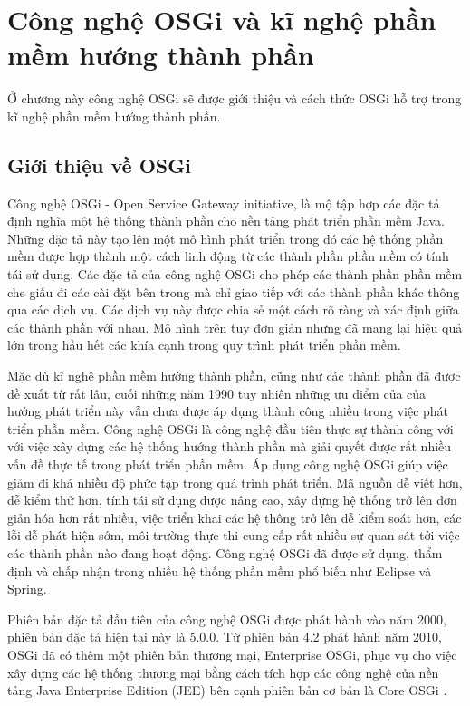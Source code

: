 \chapter{Công nghệ OSGi và kĩ nghệ phần mềm hướng thành phần}
Ở chương này công nghệ OSGi sẽ được giới thiệu và cách thức OSGi hỗ trợ trong kĩ nghệ phần mềm hướng thành phần.  
\section{Giới thiệu về OSGi}
Công nghệ OSGi - Open Service Gateway initiative, là mộ tập hợp các đặc tả định nghĩa một hệ thống thành phần cho nền tảng phát triển phần mềm Java. Những đặc tả này tạo lên một mô hình phát triển trong đó các hệ thống phần mềm được hợp thành một cách linh động từ các thành phần phần mềm có tính tái sử dụng. Các đặc tả của công nghệ OSGi cho phép các thành phần phần mềm che giấu đi các cài đặt bên trong mà chỉ giao tiếp với các thành phần khác thông qua các dịch vụ. Các dịch vụ này được chia sẻ một cách rõ ràng và xác định giữa các thành phần với nhau. Mô hình trên tuy đơn giản nhưng đã mang lại hiệu quả lớn trong hầu hết các khía cạnh trong quy trình phát triển phần mềm.

Mặc dù kĩ nghệ phần mềm hướng thành phần, cũng như các thành phần đã được đề xuất từ rất lâu, cuối những năm 1990 \cite{component-based-ian} tuy nhiên những ưu điểm của của hướng phát triển này vẫn chưa được áp dụng thành công nhiều trong việc phát triển phần mềm. Công nghệ OSGi là công nghệ đầu tiên thực sự thành công với với việc xây dựng các hệ thống hướng thành phần mà giải quyết được rất nhiều vấn đề thực tế trong phát triển phần mềm. Áp dụng công nghệ OSGi giúp việc giảm đi khá nhiều độ phức tạp trong quá trình phát triển. Mã nguồn dễ viết hơn, dễ kiểm thử hơn, tính tái sử dụng được nâng cao, xây dựng hệ thống trở lên đơn giản hóa hơn rất nhiều, việc triển khai các hệ thông trở lên dễ kiểm soát hơn, các lỗi dễ phát hiện sớm, môi trường thực thi cung cấp rất nhiều sự quan sát tới việc các thành phần nào đang hoạt động. Công nghệ OSGi đã được sử dụng, thẩm định và chấp nhận trong nhiều hệ thống phần mềm phổ biến như Eclipse và Spring.\cite{whatisosgi}

Phiên bản đặc tả đầu tiên của công nghệ OSGi được phát hành vào năm 2000, phiên bản đặc tả hiện tại này là 5.0.0. Từ phiên bản 4.2 phát hành năm 2010, OSGi đã có thêm một phiên bản thương mại, Enterprise OSGi, phục vụ cho việc xây dựng các hệ thống thương mại bằng cách tích hợp các công nghệ của nền tảng Java Enterprise Edition (JEE) bên cạnh phiên bản cơ bản là Core OSGi \cite{specs}.

